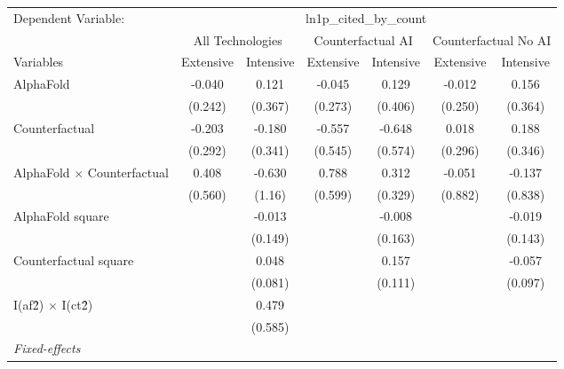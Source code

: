 \begingroup
\centering
\begin{tabular}{lcccccc}
   \tabularnewline \midrule \midrule
   Dependent Variable: & \multicolumn{6}{c}{ln1p\_cited\_by\_count}\\
 & \multicolumn{2}{c}{All Technologies} & \multicolumn{2}{c}{Counterfactual AI} & \multicolumn{2}{c}{Counterfactual No AI} \\
\cmidrule(lr){1-1}\cmidrule(lr){2-3} \cmidrule(lr){4-5} \cmidrule(lr){6-7}
Variables & \multicolumn{1}{c}{Extensive} & \multicolumn{1}{c}{Intensive} & \multicolumn{1}{c}{Extensive} & \multicolumn{1}{c}{Intensive} & \multicolumn{1}{c}{Extensive} & \multicolumn{1}{c}{Intensive} \\
\cmidrule(lr){1-1}\cmidrule(lr){2-2} \cmidrule(lr){3-3} \cmidrule(lr){4-4} \cmidrule(lr){5-5} \cmidrule(lr){6-6} \cmidrule(lr){7-7}
   AlphaFold                          & -0.040  & 0.121   & -0.045  & 0.129   & -0.012  & 0.156\\   
                                      & (0.242) & (0.367) & (0.273) & (0.406) & (0.250) & (0.364)\\   
   Counterfactual                     & -0.203  & -0.180  & -0.557  & -0.648  & 0.018   & 0.188\\   
                                      & (0.292) & (0.341) & (0.545) & (0.574) & (0.296) & (0.346)\\   
   AlphaFold $\times$ Counterfactual  & 0.408   & -0.630  & 0.788   & 0.312   & -0.051  & -0.137\\   
                                      & (0.560) & (1.16)  & (0.599) & (0.329) & (0.882) & (0.838)\\   
   AlphaFold square                   &         & -0.013  &         & -0.008  &         & -0.019\\   
                                      &         & (0.149) &         & (0.163) &         & (0.143)\\   
   Counterfactual square              &         & 0.048   &         & 0.157   &         & -0.057\\   
                                      &         & (0.081) &         & (0.111) &         & (0.097)\\   
   I(af\^2) $\times$ I(ct\^2)         &         & 0.479   &         &         &         &   \\   
                                      &         & (0.585) &         &         &         &   \\   
   \midrule
   \emph{Fixed-effects}\\

\end{tabular}
